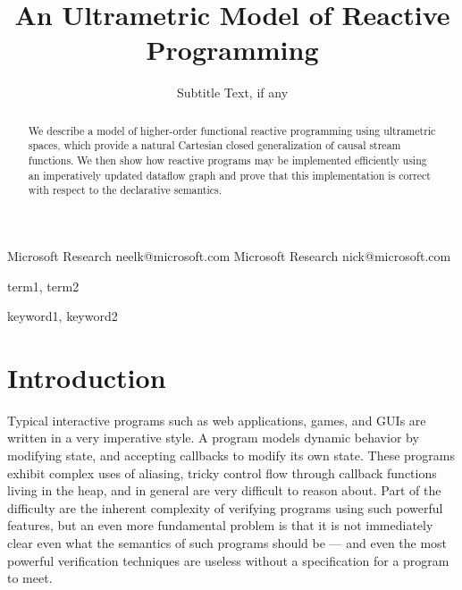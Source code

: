 \documentclass[preprint]{sigplanconf}
\begin{document}
\copyrightdata{[to be supplied]} 


\title{An Ultrametric Model of Reactive Programming}
\subtitle{Subtitle Text, if any}

           {Microsoft Research}
           {neelk@microsoft.com}
           {Microsoft Research}
           {nick@microsoft.com}

\maketitle

\begin{abstract}
We describe a model of higher-order functional reactive programming
using ultrametric spaces, which provide a natural Cartesian closed
generalization of causal stream functions. We then show how reactive
programs may be implemented efficiently using an imperatively updated
dataflow graph and prove that this implementation is correct with
respect to the declarative semantics.
\end{abstract}


\terms
term1, term2

\keywords
keyword1, keyword2

\section{Introduction}

Typical interactive programs such as web applications, games, and GUIs
are written in a very imperative style. A program models dynamic
behavior by modifying state, and accepting callbacks to modify its own
state. These programs exhibit complex uses of aliasing, tricky control
flow through callback functions living in the heap, and in general are
very difficult to reason about. Part of the difficulty are the
inherent complexity of verifying programs using such powerful
features, but an even more fundamental problem is that it is not
immediately clear even what the semantics of such programs should be
--- and even the most powerful verification techniques are useless
without a specification for a program to meet.
\end{document}
